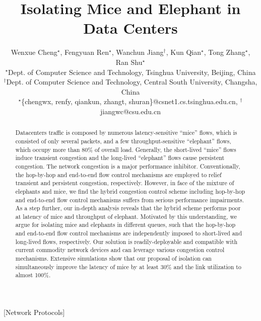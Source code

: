 \documentclass[]{sig-alternate-10pt}
\begin{document}
\title{Isolating Mice and Elephant in Data Centers}
\author{Wenxue Cheng$^\star$, Fengyuan Ren$^\star$,  Wanchun Jiang$^\dag$, Kun Qian$^\star$, Tong Zhang$^\star$, Ran Shu$^\star$\\
$^\star$Dept. of Computer Science and Technology, Tsinghua University, Beijing, China\\
$^\dag$Dept. of Computer Science and Technology, Central South University, Changsha, China\\
$^\star$\{chengwx, renfy, qiankun, zhangt, shuran\}@csnet1.cs.tsinghua.edu.cn, 
$^\dag$jiangwc@csu.edu.cn
}
\maketitle

\begin{abstract}
Datacenters traffic is composed by numerous latency-sensitive ``mice'' flows, which is consisted of only several packets, and a few throughput-sensitive ``elephant'' flows, which occupy more than 80\% of overall load. Generally, the  short-lived ``mice'' flows induce transient congestion and the long-lived ``elephant'' flows cause persistent congestion. The network congestion is a major performance inhibitor. Conventionally, the hop-by-hop and end-to-end flow control mechanisms are employed to relief transient and persistent congestion, respectively. However, in face of the mixture of elephants and mice, we find the hybrid congestion control scheme including hop-by-hop and end-to-end flow control mechanisms suffers from serious performance impairments. As a step further, our in-depth analysis reveals that the hybrid scheme performs poor at latency of mice and throughput of elephant. Motivated by this understanding, we argue for isolating mice and elephants in different queues, such that the hop-by-hop and end-to-end flow control mechanisms are independently imposed to short-lived and long-lived flows, respectively. Our solution is readily-deployable and compatible with current commodity network devices and can leverage various congestion control mechanisms. Extensive simulations show that our proposal of isolation can simultaneously improve the latency of mice by at least 30\% and the link utilization to almost 100\%.
\end{abstract}
[Network Protocols]

\end{document}
